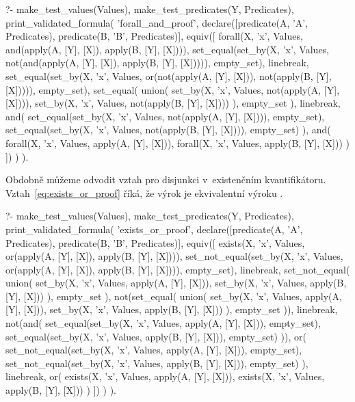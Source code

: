 \begin{prolog}
?-	make_test_values(Values),
	make_test_predicates(Y, Predicates),
	print_validated_formula(
		'forall_and_proof',
		declare([predicate(A, 'A', Predicates), predicate(B, 'B', Predicates)],
			equiv([
				forall(X, 'x', Values, and(apply(A, [Y], [X]), apply(B, [Y], [X]))),
				set_equal(set_by(X, 'x', Values, not(and(apply(A, [Y], [X]), apply(B, [Y], [X])))), empty_set),
				linebreak,
				set_equal(set_by(X, 'x', Values, or(not(apply(A, [Y], [X])), not(apply(B, [Y], [X])))), empty_set),
				set_equal(
					union(
						set_by(X, 'x', Values, not(apply(A, [Y], [X]))),
						set_by(X, 'x', Values, not(apply(B, [Y], [X])))
					),
					empty_set
				),
				linebreak,
				and(
					set_equal(set_by(X, 'x', Values, not(apply(A, [Y], [X]))), empty_set),
					set_equal(set_by(X, 'x', Values, not(apply(B, [Y], [X]))), empty_set)
				),
				and(
					forall(X, 'x', Values, apply(A, [Y], [X])),
					forall(X, 'x', Values, apply(B, [Y], [X]))
				)
			])
		)
	).
\end{prolog}

Obdobně můžeme odvodit vztah pro disjunkci v~existenčním kvantifikátoru. Vztah~\eqref{eq:exists_or_proof} říká, že výrok  je ekvivalentní výroku .

\begin{prolog}
?- 	make_test_values(Values),
	make_test_predicates(Y, Predicates),
	print_validated_formula(
		'exists_or_proof',
		declare([predicate(A, 'A', Predicates), predicate(B, 'B', Predicates)],
			equiv([
				exists(X, 'x', Values, or(apply(A, [Y], [X]), apply(B, [Y], [X]))),
				set_not_equal(set_by(X, 'x', Values, or(apply(A, [Y], [X]), apply(B, [Y], [X]))), empty_set),
				linebreak,
				set_not_equal(
					union(
						set_by(X, 'x', Values, apply(A, [Y], [X])),
						set_by(X, 'x', Values, apply(B, [Y], [X]))
					),
					empty_set
				),
				not(set_equal(
					union(
						set_by(X, 'x', Values, apply(A, [Y], [X])),
						set_by(X, 'x', Values, apply(B, [Y], [X]))
					),
					empty_set
				)),
				linebreak,
				not(and(
					set_equal(set_by(X, 'x', Values, apply(A, [Y], [X])), empty_set),
					set_equal(set_by(X, 'x', Values, apply(B, [Y], [X])), empty_set)
				)),
				or(
					set_not_equal(set_by(X, 'x', Values, apply(A, [Y], [X])), empty_set),
					set_not_equal(set_by(X, 'x', Values, apply(B, [Y], [X])), empty_set)
				),
				linebreak,
				or(
					exists(X, 'x', Values, apply(A, [Y], [X])),
					exists(X, 'x', Values, apply(B, [Y], [X]))
				)
			])
		)
	).
\end{prolog}

